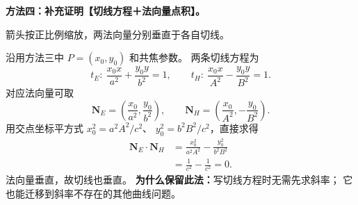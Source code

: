 \clearpage
\begin{proofbox}
\textbf{方法四：补充证明【切线方程＋法向量点积】。}

\begin{center}


{\small 箭头按正比例缩放，两法向量分别垂直于各自切线。}
\end{center}


沿用方法三中 $P=(x_0,y_0)$ 和共焦参数。
两条切线方程为
\[
 t_E:\ \frac{x_0x}{a^2}+\frac{y_0y}{b^2}=1,\qquad
 t_H:\ \frac{x_0x}{A^2}-\frac{y_0y}{B^2}=1.
\]
对应法向量可取
\[
\mathbf N_E=\left(\frac{x_0}{a^2},\frac{y_0}{b^2}\right),\qquad
\mathbf N_H=\left(\frac{x_0}{A^2},-\frac{y_0}{B^2}\right).
\]
用交点坐标平方式 $x_0^2=a^2A^2/c^2$、
$y_0^2=b^2B^2/c^2$，直接求得
\[
\begin{aligned}
\mathbf N_E\cdot\mathbf N_H
 &=\frac{x_0^2}{a^2A^2}-\frac{y_0^2}{b^2B^2}\\
 &=\frac1{c^2}-\frac1{c^2}=\boxed{0}.
\end{aligned}
\]
法向量垂直，故切线也垂直。
\textbf{为什么保留此法：}写切线方程时无需先求斜率；
它也能迁移到斜率不存在的其他曲线问题。
\end{proofbox}
